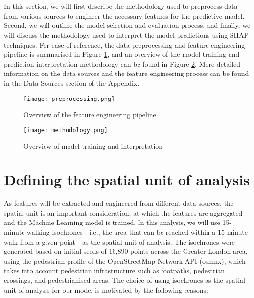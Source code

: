 \section*{}

In this section, we will first describe the methodology used to preprocess data from various sources to engineer the necessary features for the predictive model. Second, we will outline the model selection and evaluation process, and finally, we will discuss the methodology used to interpret the model predictions using SHAP techniques. For ease of reference, the data preprocessing and feature engineering pipeline is summarised in Figure \ref{fig:preprocessing}, and an overview of the model training and prediction interpretation methodology can be found in Figure \ref{fig:methodology}. More detailed information on the data sources and the feature engineering process can be found in the Data Sources section of the Appendix.

\begin{figure}[!ht]
    \centering
    \texttt{[image: preprocessing.png]}
    \caption{Overview of the feature engineering pipeline}
    \label{fig:preprocessing}
\end{figure}

\begin{figure}[!ht]
    \centering
    \texttt{[image: methodology.png]}
    \caption{Overview of model training and interpretation}
    \label{fig:methodology}
\end{figure}

\pagebreak %
\section{Defining the spatial unit of analysis}

As features will be extracted and engineered from different data sources, the spatial unit is an important consideration, at which the features are aggregated and the Machine Learning model is trained. In this analysis, we will use 15-minute walking isochrones---i.e., the area that can be reached within a 15-minute walk from a given point---as the spatial unit of analysis. The isochrones were generated based on initial seeds of 16,890 points across the Greater London area, using the pedestrian profile of the OpenStreetMap Network API (osmnx), which takes into account pedestrian infrastructure such as footpaths, pedestrian crossings, and pedestrianised areas. The choice of using isochrones as the spatial unit of analysis for our model is motivated by the following reasons: 

